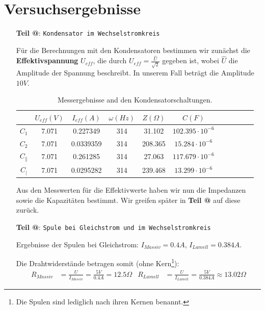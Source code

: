 \documentclass[10pt,a4paper]{article}
\makeatletter
\newcommand*{\rom}[1]{\expandafter\@slowromancap\romannumeral #1@}
\makeatother
\begin{document}
\section{Versuchsergebnisse}
\begin{flushleft}
\hypertarget{VersErg}{}
\begin{itemize}
\item[\textbf{Teil \rom{1}}:] \texttt{Kondensator im Wechselstromkreis}

Für die Berechnungen mit den Kondensatoren bestimmen wir zunächst die \textbf{Effektivspannung} $U_{eff}$, die durch $U_{eff} = \frac{\hat{U}}{\sqrt{2}}$ gegeben ist, wobei $\hat{U}$ die Amplitude der Spannung beschreibt. In unserem Fall beträgt die Amplitude $10 V$.

\begin{table}[h]
\centering
\caption{Messergebnisse and den Kondensatorschaltungen.\protect\footnotemark}
\label{tab_messerg_kond}
\begin{tabular}{|c|c|c|c|c|c|c|c|c|c|c|}
\hline
& $U_{eff} (V)$ & $I_{eff} (A)$ & $\omega (Hz)$ & $Z (\Omega)$ & $C (F)$ \\
\hline
$C_1$ & 7.071 & 0.227349 & 314 & 31.102 & $102.395 \cdot 10^{-6}$ \\ 
\hline 
$C_2$ & 7.071 & 0.0339359 & 314 & 208.365 & $15.284 \cdot 10^{-6}$ \\ 
\hline 
$C_{\parallel}$ & 7.071 & 0.261285 & 314 & 27.063 & $117.679 \cdot 10^{-6}$ \\ 
\hline 
$C_{\mid}$ & 7.071 & 0.0295282 & 314 & 239.468 & $13.299 \cdot 10^{-6}$ \\ 
\hline 
\end{tabular}
\normalsize
\end{table}

Aus den Messwerten für die Effektivwerte haben wir nun die Impedanzen sowie die Kapazitäten bestimmt. Wir greifen später in \textbf{Teil \rom{3}} auf diese zurück.

\item[\textbf{Teil \rom{2}}:] \texttt{Spule bei Gleichstrom und im Wechselstromkreis}

Ergebnisse der Spulen bei Gleichstrom: $I_{Massiv} = 0.4A$, $I_{Lamell} = 0.384A$.

Die Drahtwiderstände betragen somit (ohne Kern\footnote{Die Spulen sind lediglich nach ihren Kernen benannt.}):
\begin{align*}
R_{Massiv} &= \frac{U}{I_{Massiv}} = \frac{5 V}{0.4 A} = 12.5 \Omega & R_{Lamell} &= \frac{U}{I_{Lamell}} = \frac{5 V}{0.384 A} \approx 13.02 \Omega
\end{align*}


\end{itemize}
\end{flushleft}
\end{document}

